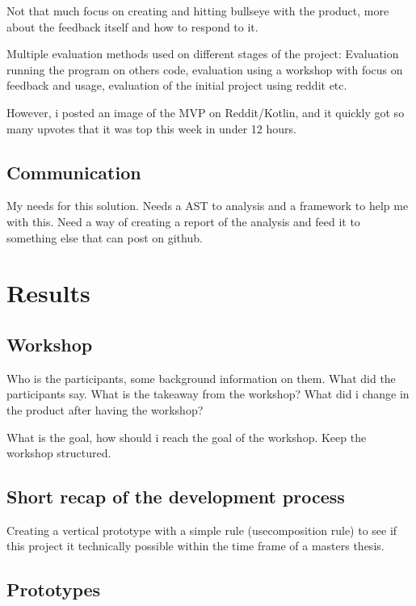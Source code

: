 \documentclass{article}
\begin{document}
Not that much focus on creating and hitting bullseye with the product, more about the feedback itself and how to respond to it.

Multiple evaluation methods used on different stages of the project: Evaluation running the program on others code, evaluation using a workshop with focus on feedback and usage, evaluation of the initial project using reddit etc.

However, i posted an image of the MVP on Reddit/Kotlin, and it quickly got so many upvotes that it was top this week in under 12 hours. 

\subsection{Communication}


My needs for this solution. Needs a AST to analysis and a framework to help me with this. Need a way of creating a report of the analysis and feed it to something else that can post on github. 


\section{Results}

\subsection{Workshop}
Who is the participants, some background information on them. What did the participants say. What is the takeaway from the workshop? What did i change in the product after having the workshop?

What is the goal, how should i reach the goal of the workshop. Keep the workshop structured.

\subsection{}

\subsection{Short recap of the development process}
Creating a vertical prototype with a simple rule (usecomposition rule) to see if this project it technically possible within the time frame of a masters thesis. 



\subsection{Prototypes}
\end{document}
